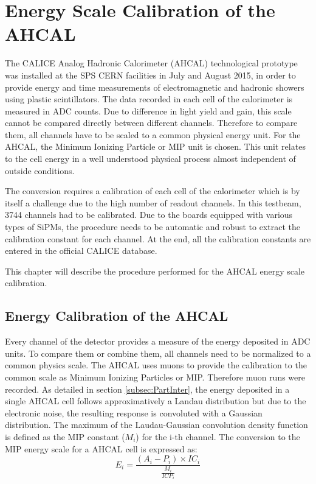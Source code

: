 \chapter{Energy Scale Calibration of the AHCAL}
\label{chap:ECalibAHCAL}

The CALICE Analog Hadronic Calorimeter (AHCAL) technological prototype was installed at the SPS CERN facilities in July and August 2015, in order to provide energy and time measurements of electromagnetic and hadronic showers using plastic scintillators. The data recorded in each cell of the calorimeter is measured in ADC counts. Due to difference in light yield and gain, this scale cannot be compared directly between different channels. Therefore to compare them, all channels have to be scaled to a common physical energy unit. For the AHCAL, the Minimum Ionizing Particle or MIP unit is chosen. This unit relates to the cell energy in a well understood physical process almost independent of outside conditions.

The conversion requires a calibration of each cell of the calorimeter which is by itself a challenge due to the high number of readout channels. In this testbeam, 3744 channels had to be calibrated. Due to the boards equipped with various types of SiPMs, the procedure needs to be automatic and robust to extract the calibration constant for each channel. At the end, all the calibration constants are entered in the official CALICE database.

This chapter will describe the procedure performed for the AHCAL energy scale calibration.

\section{Energy Calibration of the AHCAL}

Every channel of the detector provides a measure of the energy deposited in ADC units. To compare them or combine them, all channels need to be normalized to a common physics scale. The AHCAL uses muons to provide the calibration to the common scale as Minimum Ionizing Particles or MIP. Therefore muon runs were recorded. As detailed in section \ref{subsec:PartInter}, the energy deposited in a single AHCAL cell follows approximatively a Landau distribution but due to the electronic noise, the resulting response is convoluted with a Gaussian distribution. The maximum of the Laudau-Gaussian convolution density function is defined as the MIP constant ($M_{i}$) for the i-th channel. The conversion to the MIP energy scale for a AHCAL cell is expressed as:
\begin{equation}
	E_i = \frac{(A_i - P_i) \times IC_i }{\frac{M_{i}}{ICP_i}}
\end{equation}

